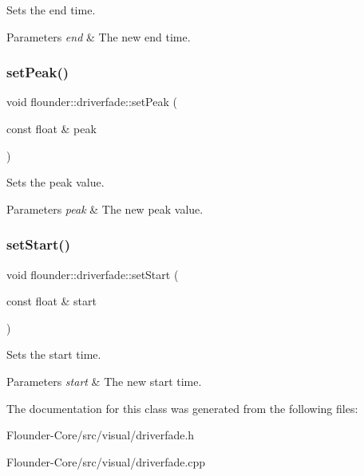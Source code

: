Sets the end time. 


\begin{DoxyParams}{Parameters}
{\em end} & The new end time. \\
\hline
\end{DoxyParams}
\mbox{\label{classflounder_1_1driverfade_a2ef147225bc3371021ab34d24ff830c2}} 
\subsubsection{\texorpdfstring{set\+Peak()}{setPeak()}}
{\footnotesize\ttfamily void flounder\+::driverfade\+::set\+Peak (\begin{DoxyParamCaption}\item[{const float \&}]{peak }\end{DoxyParamCaption})\hspace{0.3cm}{\ttfamily [inline]}}



Sets the peak value. 


\begin{DoxyParams}{Parameters}
{\em peak} & The new peak value. \\
\hline
\end{DoxyParams}
\mbox{\label{classflounder_1_1driverfade_a6a38fe711e23d2ee17909491721b9c5d}} 
\subsubsection{\texorpdfstring{set\+Start()}{setStart()}}
{\footnotesize\ttfamily void flounder\+::driverfade\+::set\+Start (\begin{DoxyParamCaption}\item[{const float \&}]{start }\end{DoxyParamCaption})\hspace{0.3cm}{\ttfamily [inline]}}



Sets the start time. 


\begin{DoxyParams}{Parameters}
{\em start} & The new start time. \\
\hline
\end{DoxyParams}


The documentation for this class was generated from the following files\+:\begin{DoxyCompactItemize}
\item 
Flounder-\/\+Core/src/visual/driverfade.\+h\item 
Flounder-\/\+Core/src/visual/driverfade.\+cpp\end{DoxyCompactItemize}
